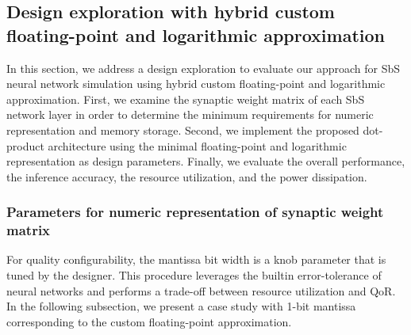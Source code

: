 \subsection{Design exploration with hybrid custom floating-point and logarithmic approximation}

In this section, we address a design exploration to evaluate our approach for SbS neural network simulation using hybrid custom floating-point and logarithmic approximation. First, we examine the synaptic weight matrix of each SbS network layer in order to determine the minimum requirements for numeric representation and memory storage. Second, we implement the proposed dot-product architecture using the minimal floating-point and logarithmic representation as design parameters. Finally, we evaluate the overall performance, the inference accuracy, the resource utilization, and the power dissipation.

\subsubsection{Parameters for numeric representation of synaptic weight matrix}
\label{sec:parameters}

For quality configurability, the mantissa bit width is a knob parameter that is tuned by the designer. This procedure leverages the builtin error-tolerance of neural networks and performs a trade-off between resource utilization and QoR. In the following subsection, we present a case study with 1-bit mantissa corresponding to the custom floating-point approximation.

